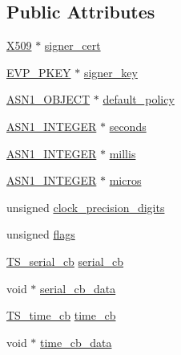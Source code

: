 \subsection*{Public Attributes}
\begin{DoxyCompactItemize}
\item 
\hyperlink{ossl__typ_8h_a4f666bde6518f95deb3050c54b408416}{X509} $\ast$ \hyperlink{struct_t_s__resp__ctx_a2f344dd9dc1e604ee5da7855251b6d57}{signer\+\_\+cert}
\item 
\hyperlink{ossl__typ_8h_a2fca4fef9e4c7a2a739b1ea04acb56ce}{E\+V\+P\+\_\+\+P\+K\+EY} $\ast$ \hyperlink{struct_t_s__resp__ctx_a0de99406a94785a97ea96c138f8fdadf}{signer\+\_\+key}
\item 
\hyperlink{asn1_8h_ae10c08e4e6b23f67a39b2add932ec48f}{A\+S\+N1\+\_\+\+O\+B\+J\+E\+CT} $\ast$ \hyperlink{struct_t_s__resp__ctx_ab537ae3d00451f1b0f95e54864b62b9a}{default\+\_\+policy}
\item 
\hyperlink{ossl__typ_8h_af4335399bf9774cb410a5e93de65998b}{A\+S\+N1\+\_\+\+I\+N\+T\+E\+G\+ER} $\ast$ \hyperlink{struct_t_s__resp__ctx_ae0758e43218c983128be53cb999d54b4}{seconds}
\item 
\hyperlink{ossl__typ_8h_af4335399bf9774cb410a5e93de65998b}{A\+S\+N1\+\_\+\+I\+N\+T\+E\+G\+ER} $\ast$ \hyperlink{struct_t_s__resp__ctx_aa2b9f8a451b9976b69f484ac83f7d491}{millis}
\item 
\hyperlink{ossl__typ_8h_af4335399bf9774cb410a5e93de65998b}{A\+S\+N1\+\_\+\+I\+N\+T\+E\+G\+ER} $\ast$ \hyperlink{struct_t_s__resp__ctx_a6e30be29e202581977057e896fc72311}{micros}
\item 
unsigned \hyperlink{struct_t_s__resp__ctx_ae73547d49818bbce3d755d7c94879c2f}{clock\+\_\+precision\+\_\+digits}
\item 
unsigned \hyperlink{struct_t_s__resp__ctx_a3c83f3eb3b737b2c62818fcfd76db5c1}{flags}
\item 
\hyperlink{ts_8h_a3f9e69bb9f4f76ac13e1706bd8763762}{T\+S\+\_\+serial\+\_\+cb} \hyperlink{struct_t_s__resp__ctx_a26180bbb9b639e92b2b0fa2c84ce30f2}{serial\+\_\+cb}
\item 
void $\ast$ \hyperlink{struct_t_s__resp__ctx_a428e1ae893e00dea7088a4caed4ff52b}{serial\+\_\+cb\+\_\+data}
\item 
\hyperlink{ts_8h_aaa41d632e556f85f0bdc2383d7b4ab59}{T\+S\+\_\+time\+\_\+cb} \hyperlink{struct_t_s__resp__ctx_a838a0b82016f7bcf6aabe4102f1a4ac8}{time\+\_\+cb}
\item 
void $\ast$ \hyperlink{struct_t_s__resp__ctx_aa818a3e3400ed231cf9b6fb084fe5cd6}{time\+\_\+cb\+\_\+data}
\item 

\end{DoxyCompactItemize}
